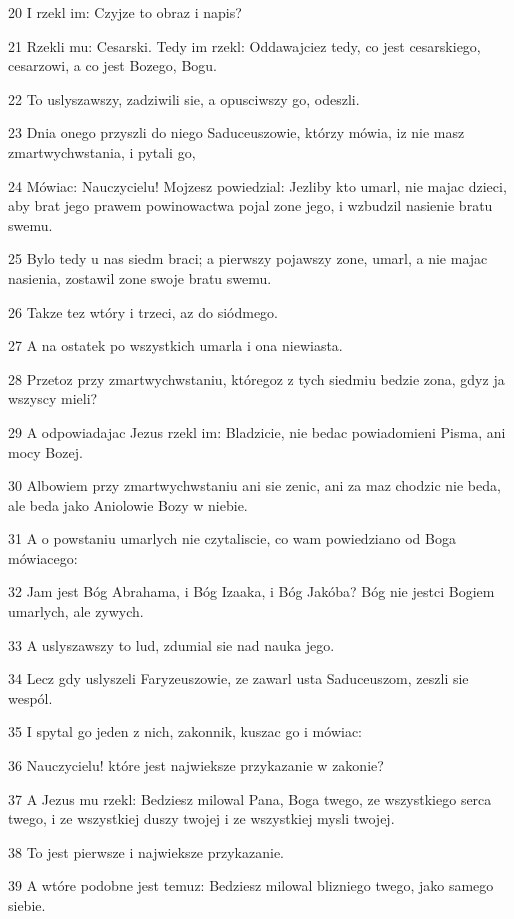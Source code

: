 \par 20 I rzekl im: Czyjze to obraz i napis?
\par 21 Rzekli mu: Cesarski. Tedy im rzekl: Oddawajciez tedy, co jest cesarskiego, cesarzowi, a co jest Bozego, Bogu.
\par 22 To uslyszawszy, zadziwili sie, a opusciwszy go, odeszli.
\par 23 Dnia onego przyszli do niego Saduceuszowie, którzy mówia, iz nie masz zmartwychwstania, i pytali go,
\par 24 Mówiac: Nauczycielu! Mojzesz powiedzial: Jezliby kto umarl, nie majac dzieci, aby brat jego prawem powinowactwa pojal zone jego, i wzbudzil nasienie bratu swemu.
\par 25 Bylo tedy u nas siedm braci; a pierwszy pojawszy zone, umarl, a nie majac nasienia, zostawil zone swoje bratu swemu.
\par 26 Takze tez wtóry i trzeci, az do siódmego.
\par 27 A na ostatek po wszystkich umarla i ona niewiasta.
\par 28 Przetoz przy zmartwychwstaniu, któregoz z tych siedmiu bedzie zona, gdyz ja wszyscy mieli?
\par 29 A odpowiadajac Jezus rzekl im: Bladzicie, nie bedac powiadomieni Pisma, ani mocy Bozej.
\par 30 Albowiem przy zmartwychwstaniu ani sie zenic, ani za maz chodzic nie beda, ale beda jako Aniolowie Bozy w niebie.
\par 31 A o powstaniu umarlych nie czytaliscie, co wam powiedziano od Boga mówiacego:
\par 32 Jam jest Bóg Abrahama, i Bóg Izaaka, i Bóg Jakóba? Bóg nie jestci Bogiem umarlych, ale zywych.
\par 33 A uslyszawszy to lud, zdumial sie nad nauka jego.
\par 34 Lecz gdy uslyszeli Faryzeuszowie, ze zawarl usta Saduceuszom, zeszli sie wespól.
\par 35 I spytal go jeden z nich, zakonnik, kuszac go i mówiac:
\par 36 Nauczycielu! które jest najwieksze przykazanie w zakonie?
\par 37 A Jezus mu rzekl: Bedziesz milowal Pana, Boga twego, ze wszystkiego serca twego, i ze wszystkiej duszy twojej i ze wszystkiej mysli twojej.
\par 38 To jest pierwsze i najwieksze przykazanie.
\par 39 A wtóre podobne jest temuz: Bedziesz milowal blizniego twego, jako samego siebie.
